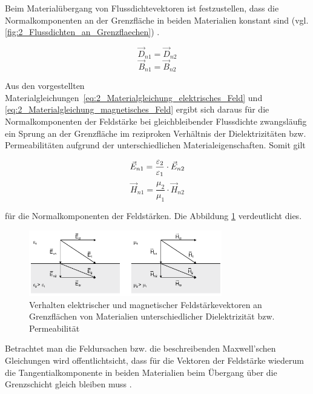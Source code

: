 Beim Materialübergang von Flussdichtevektoren ist festzustellen, dass die Normalkomponenten an der Grenzfläche in beiden Materialien konstant sind (vgl. \Abb \ref{fig:2_Flussdichten_an_Grenzflaechen}) \cite{EM_Schirmung}.  

\begin{equation}
    \vec D_{n1} = \vec D_{n2}
\end{equation}
\begin{equation}
    \vec B_{n1} = \vec B_{n2}
\end{equation}


Aus den vorgestellten Materialgleichungen~\ref{eq:2_Materialgleichung_elektrisches_Feld} und \ref{eq:2_Materialgleichung_magnetisches_Feld} ergibt sich daraus für die Normalkomponenten der Feldstärke bei gleichbleibender Flussdichte zwangsläufig ein Sprung an der Grenzfläche im reziproken Verhältnis der Dielektrizitäten bzw. Permeabilitäten aufgrund der unterschiedlichen Materialeigenschaften. Somit gilt

\begin{equation}
    \vec E_{n1} = \frac{\varepsilon_2}{\varepsilon_1} \cdot \vec E_{n2} \\
\end{equation}
\begin{equation}
    \vec H_{n1} = \frac{\mu_2}{\mu_1} \cdot \vec H_{n2}
\end{equation}

für die Normalkomponenten der Feldstärken. Die Abbildung \ref{fig:2_Feldstaerken_an_Grenzflaechen} verdeutlicht dies. 

\begin{figure}[ht]
    \centering
    \includegraphics[width=0.75\textwidth]{Abbildungen/Kapitel2/Feldstaerken_an_Grenzflaechen.png}
    \caption{Verhalten elektrischer und magnetischer Feldstärkevektoren an Grenzflächen von \mbox{Materialien} unterschiedlicher Dielektrizität bzw. Permeabilität}
    \label{fig:2_Feldstaerken_an_Grenzflaechen}
\end{figure}

Betrachtet man die Feldursachen bzw. die beschreibenden Maxwell'schen Gleichungen wird offentlichtsicht, dass für die Vektoren der Feldstärke wiederum die Tangentialkomponente in beiden Materialien beim Übergang über die Grenzschicht gleich bleiben muss \cite{EM_Schirmung}. 

